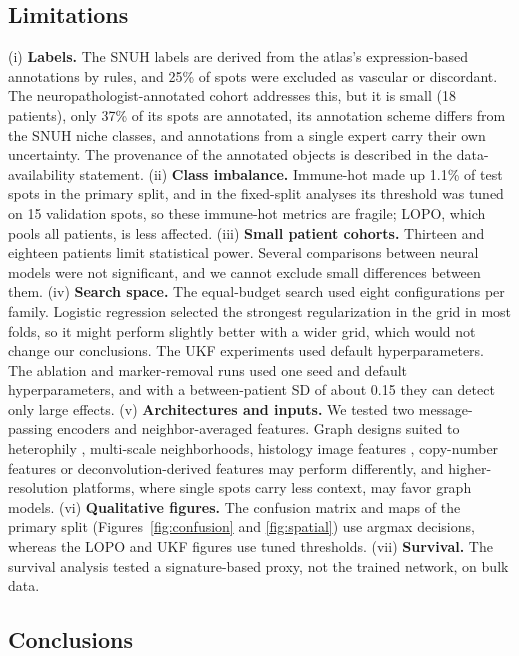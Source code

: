 \documentclass[11pt,letterpaper]{article}
\begin{document}
\subsection{Limitations}

(i) \textbf{Labels.} The SNUH labels are derived from the atlas's expression-based annotations by rules, and 25\% of spots were excluded as vascular or discordant. The neuropathologist-annotated cohort addresses this, but it is small (18 patients), only 37\% of its spots are annotated, its annotation scheme differs from the SNUH niche classes, and annotations from a single expert carry their own uncertainty. The provenance of the annotated objects is described in the data-availability statement. (ii) \textbf{Class imbalance.} Immune-hot made up 1.1\% of test spots in the primary split, and in the fixed-split analyses its threshold was tuned on 15 validation spots, so these immune-hot metrics are fragile; LOPO, which pools all patients, is less affected. (iii) \textbf{Small patient cohorts.} Thirteen and eighteen patients limit statistical power. Several comparisons between neural models were not significant, and we cannot exclude small differences between them. (iv) \textbf{Search space.} The equal-budget search used eight configurations per family. Logistic regression selected the strongest regularization in the grid in most folds, so it might perform slightly better with a wider grid, which would not change our conclusions. The UKF experiments used default hyperparameters. The ablation and marker-removal runs used one seed and default hyperparameters, and with a between-patient SD of about 0.15 they can detect only large effects. (v) \textbf{Architectures and inputs.} We tested two message-passing encoders and neighbor-averaged features. Graph designs suited to heterophily \cite{zhu2020homophily}, multi-scale neighborhoods, histology image features \cite{hu2021spagcn}, copy-number features \cite{ritter2025} or deconvolution-derived features \cite{kleshchevnikov2022} may perform differently, and higher-resolution platforms, where single spots carry less context, may favor graph models. (vi) \textbf{Qualitative figures.} The confusion matrix and maps of the primary split (Figures~\ref{fig:confusion} and \ref{fig:spatial}) use argmax decisions, whereas the LOPO and UKF figures use tuned thresholds. (vii) \textbf{Survival.} The survival analysis tested a signature-based proxy, not the trained network, on bulk data.

\subsection{Conclusions}
\end{document}
